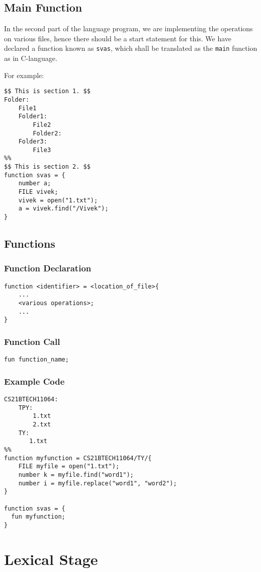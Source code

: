 \documentclass{article}
\begin{document}
\subsection{Main Function}
In the second part of the language program, we are implementing the operations on various files, hence there should be a start statement for this. We have declared a function known as \texttt{svas}, which shall be translated as the \texttt{main} function as in C-language.

For example:
\begin{verbatim}
$$ This is section 1. $$
Folder:
    File1
    Folder1:
        File2
        Folder2:
    Folder3:
        File3
%%
$$ This is section 2. $$
function svas = {
    number a;
    FILE vivek;
    vivek = open("1.txt");
    a = vivek.find("/Vivek");
}
\end{verbatim}
\subsection{Functions}
\subsubsection{Function Declaration}
\begin{verbatim}
function <identifier> = <location_of_file>{
    ...
    <various operations>;
    ...
}
\end{verbatim}

\subsubsection{Function Call}
\begin{verbatim}
fun function_name;
\end{verbatim}

\subsubsection{Example Code}
\begin{verbatim}
CS21BTECH11064:
    TPY:
        1.txt
        2.txt
    TY:
       1.txt
%%
function myfunction = CS21BTECH11064/TY/{
    FILE myfile = open("1.txt");
    number k = myfile.find("word1");
    number i = myfile.replace("word1", "word2");
}

function svas = {
  fun myfunction;
}
\end{verbatim}

\section{Lexical Stage}
\end{document}
